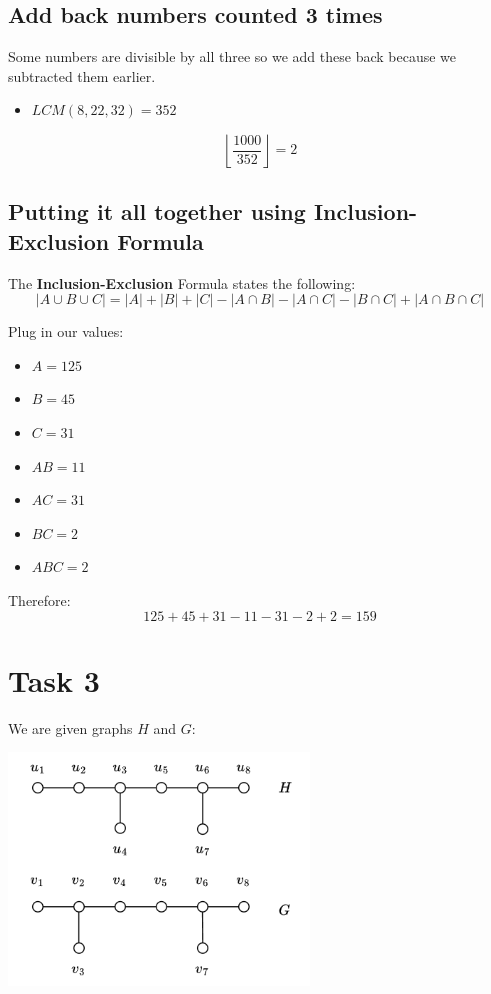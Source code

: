 \documentclass[11pt]{article}
\begin{document}
\subsection{Add back numbers counted 3 times}
\label{sec:org74827cc}
Some numbers are divisible by all three so we add these back because we subtracted them earlier.
\begin{itemize}
\item \(LCM(8, 22, 32) = 352\)
\end{itemize}
\[
\left\lfloor \frac{1000}{352} \right\rfloor = 2
\]
\subsection{Putting it all together using Inclusion-Exclusion Formula}
\label{sec:org7aa7187}
The \textbf{Inclusion-Exclusion} Formula states the following:
\[
\left|A \cup B \cup C \right| = \left|A\right| + \left|B\right| + \left|C \right| - \left|A \cap B \right| - \left|A \cap C \right| - \left|B \cap C \right| + \left|A \cap B \cap C \right|
\]

Plug in our values:
\begin{itemize}
\item \(A = 125\)
\item \(B = 45\)
\item \(C = 31\)
\item \(AB = 11\)
\item \(AC = 31\)
\item \(BC = 2\)
\item \(ABC = 2\)
\end{itemize}

Therefore:
\[
125 + 45 + 31 - 11 - 31 - 2 + 2 = 159
\]

\newpage
\section{Task 3}
\label{sec:orgbac8752}
We are given graphs \(H\) and \(G\):
\begin{center}
\includegraphics[width=0.6\textwidth]{./grappherr.png}
\end{center}
\end{document}
